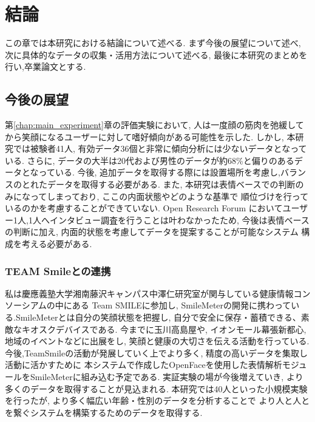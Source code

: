 \chapter{結論}
\label{chap:conclusion}

この章では本研究における結論について述べる.
まず今後の展望について述べ, 次に具体的なデータの収集・活用方法について述べる,
最後に本研究のまとめを行い,卒業論文とする.

\section{今後の展望}
第\ref{chap:main_experiment}章の評価実験において, 人は一度顔の筋肉を弛緩してから笑顔になるユーザーに対して嗜好傾向がある可能性を示した.
しかし, 本研究では被験者41人, 有効データ36個と非常に傾向分析には少ないデータとなっている.
さらに, データの大半は20代および男性のデータが約68\%と偏りのあるデータとなっている.
今後, 追加データを取得する際には設置場所を考慮し,バランスのとれたデータを取得する必要がある.
また, 本研究は表情ベースでの判断のみになってしまっており, ここの内面状態やどのような基準で
順位づけを行っているのかを考慮することができていない.
Open Research Forum においてユーザー1人,1人へインタビュー調査を行うことは叶わなかったため,
今後は表情ベースの判断に加え, 内面的状態を考慮してデータを提案することが可能なシステム
構成を考える必要がある.

\subsection{TEAM Smileとの連携}
私は慶應義塾大学湘南藤沢キャンパス中澤仁研究室が関与している健康情報コンソーシアムの中にある
Team SMILEに参加し, SmileMeterの開発に携わっている.\cite{teamSMILE}SmileMeterとは自分の笑顔状態を把握し,
自分で安全に保存・蓄積できる、素敵なキオスクデバイスである.
今までに玉川高島屋や, イオンモール幕張新都心, 地域のイベントなどに出展をし,
笑顔と健康の大切さを伝える活動を行っている.
今後,TeamSmileの活動が発展していく上でより多く, 精度の高いデータを集取し活動に活かすために
本システムで作成したOpenFaceを使用した表情解析モジュールをSmileMeterに組み込む予定である.
実証実験の場が今後増えていき, より多くのデータを取得することが見込まれる.
本研究では40人といった小規模実験を行ったが,  より多く幅広い年齢・性別のデータを分析することで
より人と人とを繋ぐシステムを構築するためのデータを取得する.

